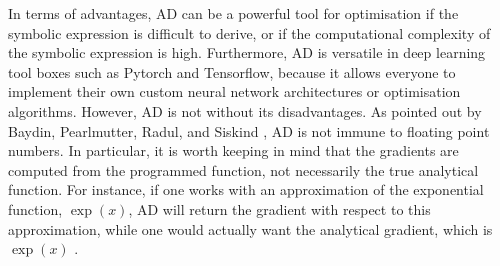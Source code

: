 In terms of advantages, AD can be a powerful tool for optimisation if the symbolic expression is difficult to derive, or if the computational complexity of the symbolic expression is high.
Furthermore, AD is versatile in deep learning tool boxes such as Pytorch and Tensorflow,
because it allows everyone to implement their own custom neural network architectures or optimisation algorithms.
However, AD is not without its disadvantages. As pointed out by Baydin, Pearlmutter, Radul, and Siskind \cite{baydin2018automatic},
AD is not immune to floating point numbers.
In particular, it is worth keeping in mind that the gradients are computed from the programmed function, not necessarily the true analytical function.
For instance, if one works with an approximation of the exponential function, $\exp(x)$, AD will return the gradient with respect to this approximation,
while one would actually want the analytical gradient, which is $\exp(x)$ \cite{baydin2018automatic}. %







